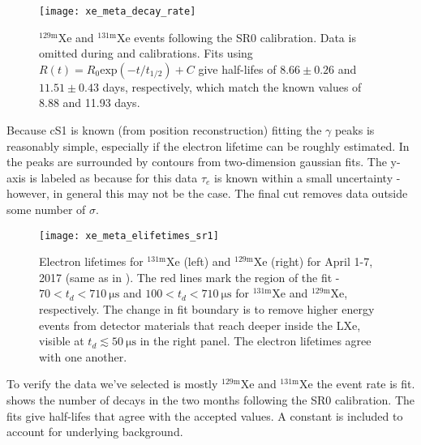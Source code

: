 \begin{figure}
\centering
\texttt{[image: xe\_meta\_decay\_rate]}
\caption[$\mathrm{^{129m}Xe}$ and $\mathrm{^{131m}Xe}$ events following the SR0 \ambe calibration.  Data is omitted during \metakr
and  calibrations.]{$\mathrm{^{129m}Xe}$ and
$\mathrm{^{131m}Xe}$ events following the SR0 \ambe calibration.  Data is omitted during \metakr
and  calibrations.  Fits using $R(t) = R_0 \mathrm{exp}(-t/t_{1/2}) + C$ give half-lifes of $8.66 \pm 0.26$ and
$11.51 \pm 0.43$ days, respectively, which match the known values of 8.88 and 11.93 days.}
\label{fig:electron_lifetimes_measurement_gammas_decay_rate}
\end{figure}

Because cS1 is known (from position reconstruction) fitting the $\gamma$ peaks is reasonably simple, especially if the electron lifetime
can be roughly estimated.  In
 the peaks are surrounded by contours from two-dimension gaussian fits.  The
y-axis is labeled as \cstwob because for this data $\tau_e$ is known within a small uncertainty - however, in general this may not be
the case.  The final cut removes data outside some number of $\sigma$.

\begin{figure}
\centering
\texttt{[image: xe\_meta\_elifetimes\_sr1]}
\caption[Electron lifetimes for $\mathrm{^{131m}Xe}$ and $\mathrm{^{129m}Xe}$ for April 1-7, 2017 (same as in
).]{Electron lifetimes for $\mathrm{^{131m}Xe}$ (left) and $\mathrm{^{129m}Xe}$
(right) for April 1-7, 2017 (same as in
).  The red lines mark the region of the fit - $70 < t_d < 710\ \mathrm{\mu s}$
and $100 < t_d < 710\ \mathrm{\mu s}$ for $\mathrm{^{131m}Xe}$ and $\mathrm{^{129m}Xe}$, respectively.  The change in fit boundary is to
remove higher energy events from detector materials that reach deeper inside the LXe, visible at $t_d \lesssim 50\ \mathrm{\mu s}$ in the
right panel.  The electron lifetimes agree with one another.}
\label{fig:electron_lifetimes_measurement_gammas_elifetime}
\end{figure}

To verify the data we've selected is mostly $\mathrm{^{129m}Xe}$ and $\mathrm{^{131m}Xe}$ the event rate is
fit.  shows the number of decays in the two months following the
SR0 \ambe calibration.  The fits give half-lifes that agree with the accepted values.  A constant is included to account for underlying
background.

